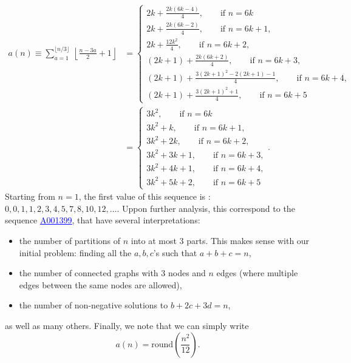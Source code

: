         \begin{align}
            a(n)\equiv\sum^{\lfloor n/3\rfloor}_{a=1}~\left\lfloor \frac{n-3a}{2}+1\right\rfloor&=
            \begin{cases}
                2k+\frac{2k(6k-4)}{4},\qquad\text{if $n=6k$}\\
                2k+\frac{2k(6k-2)}{4},\qquad\text{if $n=6k+1$},\\
                2k+\frac{12k^2}{4},\qquad\text{if $n=6k+2$},\\
                (2k+1)+\frac{2k(6k+2)}{4},\qquad\text{if $n=6k+3$},\\
                (2k+1)+\frac{3(2k+1)^2-2(2k+1)-1}{4},\qquad\text{if $n=6k+4$},\\
                (2k+1)+\frac{3(2k+1)^2+1}{4},\qquad\text{if $n=6k+5$}
            \end{cases}\\
            &=
            \begin{cases}
                3k^2,\qquad\text{if $n=6k$}\\
                3k^2+k,\qquad\text{if $n=6k+1$},\\
                3k^2+2k,\qquad\text{if $n=6k+2$},\\
                3k^2+3k+1,\qquad\text{if $n=6k+3$},\\
                3k^2+4k+1,\qquad\text{if $n=6k+4$},\\
                3k^2+5k+2,\qquad\text{if $n=6k+5$}
            \end{cases}.
        \end{align}
        Starting from $n=1$, the first value of this sequence is : $0,0,1,1,2,3,4,5,7,8,10,12,\dots$. Uppon  further analysis, this correspond to the sequence \href{https://oeis.org/A001399}{\textcolor{blue}{\underline{A001399}}}, that have several interpretations:
        \begin{itemize}
            \item the number of partitions of $n$ into at most 3 parts. This makes sense with our initial problem: finding all the $a,b,c$'s such that $a+b+c=n$,
            \item the number of connected graphs with $3$ nodes and $n$ edges (where multiple edges between the same nodes are allowed),
            \item the number of non-negative solutions to $b+2c+3d=n$,
        \end{itemize}
        as well as many others. Finally, we note that we can simply write
        \begin{equation}
            a(n)=\text{round}\left(\frac{n^2}{12}\right).
        \end{equation}